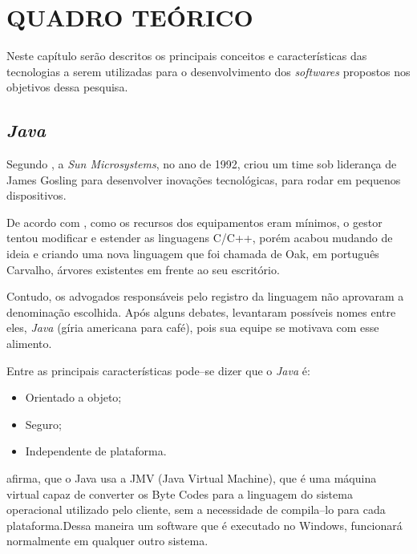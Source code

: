 \chapter{QUADRO TEÓRICO}

	\par Neste capítulo serão descritos os principais conceitos e características
das tecnologias a serem utilizadas para o desenvolvimento dos \textit{softwares}
propostos nos objetivos dessa pesquisa.

\section{\textit{Java}}

	\par Segundo , a \textit{Sun Microsystems}, no ano de 1992,
criou um time sob liderança de James Gosling para desenvolver inovações
tecnológicas, para rodar em pequenos dispositivos.

	\par De acordo com , como os recursos dos
equipamentos eram mínimos, o gestor tentou modificar e estender as linguagens
C/C++, porém acabou mudando de ideia e criando uma nova linguagem que foi
chamada de Oak, em português Carvalho, árvores existentes em frente ao seu
escritório.

	\par Contudo, os advogados responsáveis pelo registro da linguagem não
aprovaram a denominação escolhida. Após alguns debates, levantaram possíveis
nomes entre eles, \textit{Java} (gíria americana para café), pois sua equipe se
motivava com esse alimento.

	\par Entre as principais características pode–se dizer que o \textit{Java} é:
	\begin{itemize}
	  \item Orientado a objeto;
	  \item Seguro;
	  \item Independente de plataforma.  
	\end{itemize}
	
	\par {} afirma, que o Java usa a JMV (Java Virtual
Machine), que é uma máquina virtual capaz de converter os Byte Codes para a
linguagem do sistema operacional utilizado pelo cliente, sem a necessidade de
compila–lo para cada plataforma.Dessa maneira um software que é executado no
Windows, funcionará normalmente em qualquer outro sistema.

